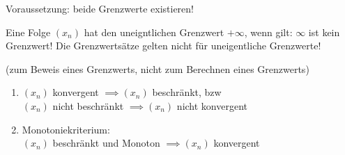 \documentclass{../tudscript}
\begin{document}
    Voraussetzung: beide Grenzwerte existieren!

    Eine Folge $(x_n)$ hat den uneigntlichen Grenzwert $+ \infty$, wenn gilt:
    $\infty$ ist kein Grenzwert!
    Die Grenzwertsätze gelten nicht für uneigentliche Grenzwerte!
     

    
    
    (zum Beweis eines Grenzwerts, nicht zum Berechnen eines Grenzwerts)
    \begin{enumerate}
        \item $(x_n)$ konvergent $\implies (x_n)$ beschränkt, bzw \\
              $(x_n)$ nicht beschränkt $\implies (x_n)$ nicht konvergent
        \item Monotoniekriterium:\\ 
        $(x_n)$ beschränkt und Monoton $\implies (x_n)$ konvergent
    \end{enumerate}
\end{document}
